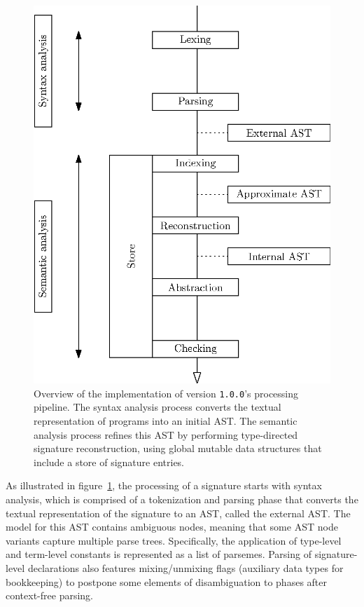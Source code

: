 \begin{figure}
\centering
\includegraphics{figures/legacy-beluga-processing-pipeline.eps}
\caption[Overview of the implementation of \Beluga version \texttt{1.0.0}'s processing pipeline.]{%
Overview of the implementation of \Beluga version \texttt{1.0.0}'s processing pipeline.
The syntax analysis process converts the textual representation of \Beluga programs into an initial \acs{AST}.
The semantic analysis process refines this \acs{AST} by performing type-directed signature reconstruction, using global mutable data structures that include a store of signature entries.
}
\label{figure:legacy-beluga-processing-pipeline}
\end{figure}

As illustrated in figure~\ref{figure:legacy-beluga-processing-pipeline}, the processing of a \Beluga signature starts with syntax analysis, which is comprised of a tokenization and parsing phase that converts the textual representation of the signature to an \ac{AST}, called the external \ac{AST}.
The model for this \ac{AST} contains ambiguous nodes, meaning that some \ac{AST} node variants capture multiple parse trees.
Specifically, the application of \LF type-level and term-level constants is represented as a list of parsemes.
Parsing of signature-level declarations also features mixing/unmixing flags (auxiliary data types for bookkeeping) to postpone some elements of disambiguation to phases after context-free parsing.

